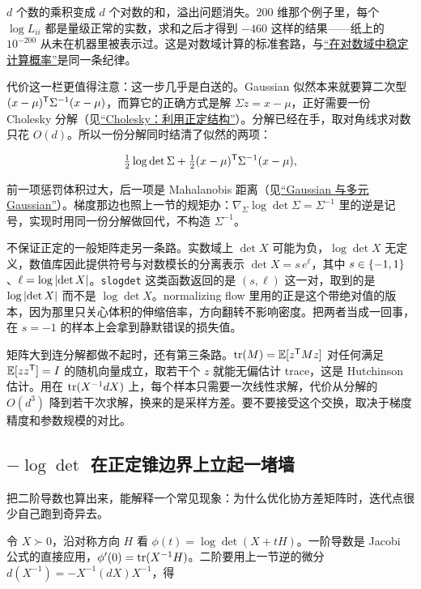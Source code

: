 \(d\) 个数的乘积变成 \(d\) 个对数的和，溢出问题消失。\(200\) 维那个例子里，每个 \(\log L_{ii}\) 都是量级正常的实数，求和之后才得到 \(-460\) 这样的结果——纸上的 \(10^{-200}\) 从未在机器里被表示过。这是对数域计算的标准套路，与\hyperref[sec:08-Numerical-Analysis/07-Numerical-Methods-for-ML/01]{``在对数域中稳定计算概率''}是同一条纪律。

代价这一栏更值得注意：这一步几乎是白送的。Gaussian 似然本来就要算二次型 \((x-\mu)^{\mathsf{T}}\Sigma^{-1}(x-\mu)\)，而算它的正确方式是解 \(\Sigma z=x-\mu\)，正好需要一份 Cholesky 分解（见\hyperref[sec:08-Numerical-Analysis/05-Numerical-Linear-Algebra/03]{``Cholesky：利用正定结构''}）。分解已经在手，取对角线求对数只花 \(O(d)\)。所以一份分解同时结清了似然的两项：

\[
\tfrac12\log\det\Sigma+\tfrac12(x-\mu)^{\mathsf{T}}\Sigma^{-1}(x-\mu),
\]

前一项惩罚体积过大，后一项是 Mahalanobis 距离（见\hyperref[sec:05-Probability/06-Common-Distributions/05]{``Gaussian 与多元 Gaussian''}）。梯度那边也照上一节的规矩办：\(\nabla_\Sigma\log\det\Sigma=\Sigma^{-1}\) 里的逆是记号，实现时用同一份分解做回代，不构造 \(\Sigma^{-1}\)。

不保证正定的一般矩阵走另一条路。实数域上 \(\det X\) 可能为负，\(\log\det X\) 无定义，数值库因此提供符号与对数模长的分离表示 \(\det X=s\,e^{\ell}\)，其中 \(s\in\left\{-1,1\right\}\)、\(\ell=\log\left|\det X\right|\)。\texttt{slogdet} 这类函数返回的是 \((s,\ell)\) 这一对，取到的是 \(\log\left|\det X\right|\) 而不是 \(\log\det X\)。normalizing flow 里用的正是这个带绝对值的版本，因为那里只关心体积的伸缩倍率，方向翻转不影响密度。把两者当成一回事，在 \(s=-1\) 的样本上会拿到静默错误的损失值。

矩阵大到连分解都做不起时，还有第三条路。\(\operatorname{tr}(M)=\mathbb{E}[z^{\mathsf{T}}Mz]\) 对任何满足 \(\mathbb{E}[zz^{\mathsf{T}}]=I\) 的随机向量成立，取若干个 \(z\) 就能无偏估计 trace，这是 Hutchinson 估计。用在 \(\operatorname{tr}(X^{-1}dX)\) 上，每个样本只需要一次线性求解，代价从分解的 \(O(d^3)\) 降到若干次求解，换来的是采样方差。要不要接受这个交换，取决于梯度精度和参数规模的对比。

\subsection{\texorpdfstring{\(-\log\det\) 在正定锥边界上立起一堵墙}{-log det 在正定锥边界上立起一堵墙}}

把二阶导数也算出来，能解释一个常见现象：为什么优化协方差矩阵时，迭代点很少自己跑到奇异去。

令 \(X\succ0\)，沿对称方向 \(H\) 看 \(\phi(t)=\log\det(X+tH)\)。一阶导数是 Jacobi 公式的直接应用，\(\phi'(0)=\operatorname{tr}(X^{-1}H)\)。二阶要用上一节逆的微分 \(d(X^{-1})=-X^{-1}(dX)X^{-1}\)，得

